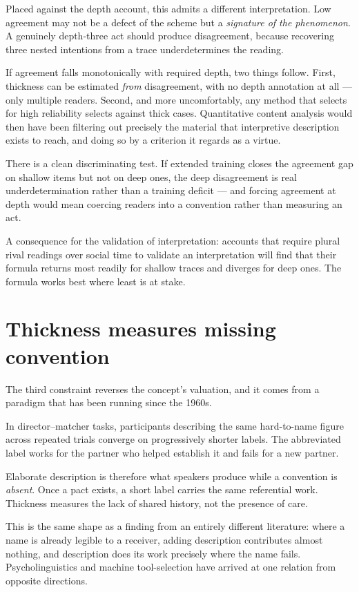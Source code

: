\documentclass[11pt,a4paper]{article}
\begin{document}
Placed against the depth account, this admits a different interpretation. Low agreement may not be a defect of the scheme but a \emph{signature of the phenomenon}. A genuinely depth-three act should produce disagreement, because recovering three nested intentions from a trace underdetermines the reading.

If agreement falls monotonically with required depth, two things follow. First, thickness can be estimated \emph{from} disagreement, with no depth annotation at all --- only multiple readers. Second, and more uncomfortably, any method that selects for high reliability selects against thick cases. Quantitative content analysis would then have been filtering out precisely the material that interpretive description exists to reach, and doing so by a criterion it regards as a virtue.

There is a clean discriminating test. If extended training closes the agreement gap on shallow items but not on deep ones, the deep disagreement is real underdetermination rather than a training deficit --- and forcing agreement at depth would mean coercing readers into a convention rather than measuring an act.

A consequence for the validation of interpretation: accounts that require plural rival readings over social time to validate an interpretation will find that their formula returns most readily for shallow traces and diverges for deep ones. The formula works best where least is at stake.

\section{Thickness measures missing convention}
The third constraint reverses the concept's valuation, and it comes from a paradigm that has been running since the 1960s.

In director--matcher tasks, participants describing the same hard-to-name figure across repeated trials converge on progressively shorter labels. The abbreviated label works for the partner who helped establish it and fails for a new partner.

Elaborate description is therefore what speakers produce while a convention is \emph{absent}. Once a pact exists, a short label carries the same referential work. Thickness measures the lack of shared history, not the presence of care.

This is the same shape as a finding from an entirely different literature: where a name is already legible to a receiver, adding description contributes almost nothing, and description does its work precisely where the name fails. Psycholinguistics and machine tool-selection have arrived at one relation from opposite directions.
\end{document}
